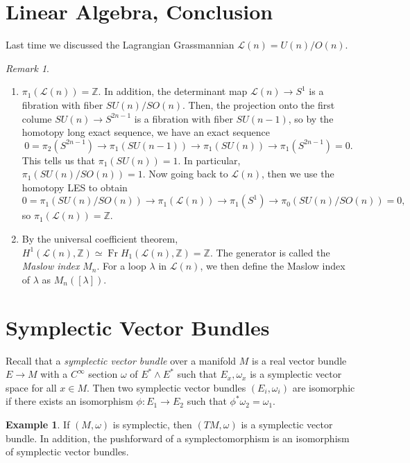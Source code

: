 \documentclass[leqno, openany]{memoir}
\theoremstyle{definition}
\newtheorem{exm}[thm]{Example}
\theoremstyle{remark}
\newtheorem{rmk}[thm]{Remark}
\theoremstyle{plain}
\theoremstyle{definition}
\theoremstyle{remark}
\newcommand{\Z}{\mathbb{Z}}
\newcommand{\mc}[1]{\mathcal{#1}}
\begin{document}
\section{Linear Algebra, Conclusion}%
\label{sec:linear_algebra_conclusion}

Last time we discussed the Lagrangian Grassmannian $\mc{L}(n) = U(n)/O(n)$.
\begin{rmk}
    \begin{enumerate}
        \item $\pi_1(\mc{L}(n)) = \Z$. In addition, the determinant map $\mc{L}(n) \to S^1$ is a fibration with fiber $SU(n)/SO(n)$. Then, the projection onto the first colume $SU(n) \to S^{2n-1}$ is a fibration with fiber $SU(n-1)$, so by the homotopy long exact sequence, we have an exact sequence
            \[ 0 = \pi_2(S^{2n-1}) \to \pi_1(SU(n-1)) \to \pi_1(SU(n)) \to \pi_1(S^{2n-1}) = 0.\]
            This tells us that $\pi_1(SU(n)) = 1$. In particular, $\pi_1(SU(n)/SO(n)) = 1$. Now going back to $\mc{L}(n)$, then we use the homotopy LES to obtain
            \[ 0 = \pi_1(SU(n)/SO(n)) \to \pi_1(\mc{L}(n)) \to \pi_1(S^1) \to \pi_0(SU(n)/SO(n)) = 0, \]
            so $\pi_1(\mc{L}(n)) = \Z$.
        \item By the universal coefficient theorem, $H^1(\mc{L}(n), \Z) \simeq \operatorname{Fr} H_1(\mc{L}(n), \Z) = \Z$. The generator is called the \textit{Maslow index} $M_n$. For a loop $\lambda$ in $\mc{L}(n)$, we then define the Maslow index of $\lambda$ as $M_n([\lambda])$.
    \end{enumerate}
\end{rmk}

\section{Symplectic Vector Bundles}%
\label{sec:symplectic_vector_bundles}

Recall that a \textit{symplectic vector bundle} over a manifold $M$ is a real vector bundle $E \to M$ with a $C^{\infty}$ section $\omega$ of $E^* \wedge E^*$ such that $E_x, \omega_x$ is a symplectic vector space for all $x \in M$. Then two symplectic vector bundles $(E_i, \omega_i)$ are isomorphic if there exists an isomorphism $\phi: E_1 \to E_2$ such that $\phi^* \omega_2 = \omega_1$.

\begin{exm}
    If $(M, \omega)$ is symplectic, then $(TM, \omega)$ is a symplectic vector bundle. In addition, the pushforward of a symplectomorphism is an isomorphism of symplectic vector bundles.
\end{exm}
\end{document}

